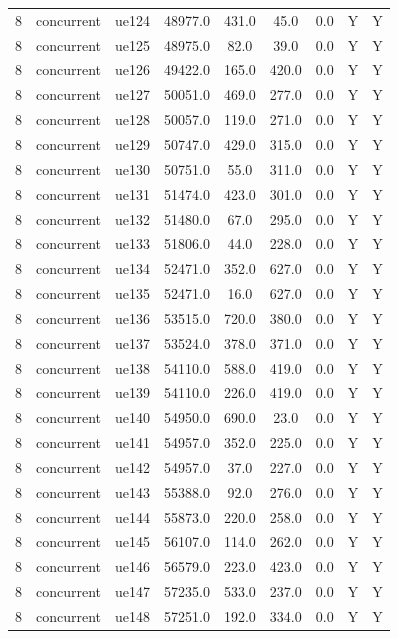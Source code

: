 \begin{table}[ht]
\begin{tabular}{|c|c|c|c|c|c|c|c|c|}
8 & concurrent & ue124 & 48977.0 & 431.0 & 45.0 & 0.0 & Y & Y \\
8 & concurrent & ue125 & 48975.0 & 82.0 & 39.0 & 0.0 & Y & Y \\
8 & concurrent & ue126 & 49422.0 & 165.0 & 420.0 & 0.0 & Y & Y \\
8 & concurrent & ue127 & 50051.0 & 469.0 & 277.0 & 0.0 & Y & Y \\
8 & concurrent & ue128 & 50057.0 & 119.0 & 271.0 & 0.0 & Y & Y \\
8 & concurrent & ue129 & 50747.0 & 429.0 & 315.0 & 0.0 & Y & Y \\
8 & concurrent & ue130 & 50751.0 & 55.0 & 311.0 & 0.0 & Y & Y \\
8 & concurrent & ue131 & 51474.0 & 423.0 & 301.0 & 0.0 & Y & Y \\
8 & concurrent & ue132 & 51480.0 & 67.0 & 295.0 & 0.0 & Y & Y \\
8 & concurrent & ue133 & 51806.0 & 44.0 & 228.0 & 0.0 & Y & Y \\
8 & concurrent & ue134 & 52471.0 & 352.0 & 627.0 & 0.0 & Y & Y \\
8 & concurrent & ue135 & 52471.0 & 16.0 & 627.0 & 0.0 & Y & Y \\
8 & concurrent & ue136 & 53515.0 & 720.0 & 380.0 & 0.0 & Y & Y \\
8 & concurrent & ue137 & 53524.0 & 378.0 & 371.0 & 0.0 & Y & Y \\
8 & concurrent & ue138 & 54110.0 & 588.0 & 419.0 & 0.0 & Y & Y \\
8 & concurrent & ue139 & 54110.0 & 226.0 & 419.0 & 0.0 & Y & Y \\
8 & concurrent & ue140 & 54950.0 & 690.0 & 23.0 & 0.0 & Y & Y \\
8 & concurrent & ue141 & 54957.0 & 352.0 & 225.0 & 0.0 & Y & Y \\
8 & concurrent & ue142 & 54957.0 & 37.0 & 227.0 & 0.0 & Y & Y \\
8 & concurrent & ue143 & 55388.0 & 92.0 & 276.0 & 0.0 & Y & Y \\
8 & concurrent & ue144 & 55873.0 & 220.0 & 258.0 & 0.0 & Y & Y \\
8 & concurrent & ue145 & 56107.0 & 114.0 & 262.0 & 0.0 & Y & Y \\
8 & concurrent & ue146 & 56579.0 & 223.0 & 423.0 & 0.0 & Y & Y \\
8 & concurrent & ue147 & 57235.0 & 533.0 & 237.0 & 0.0 & Y & Y \\
8 & concurrent & ue148 & 57251.0 & 192.0 & 334.0 & 0.0 & Y & Y \\

\end{tabular}
\end{table}
